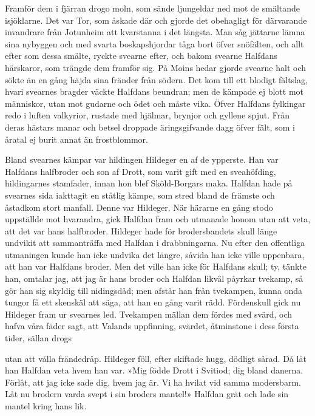 Framför dem i fjärran drogo moln, som sände ljungeldar ned mot de
smältande isjöklarne. Det var Tor, som åskade där och gjorde det
obehagligt för därvarande invandrare från Jotunheim att kvarstanna i det
längsta. Man såg jättarne lämna sina nybyggen och med svarta
boskapshjordar tåga bort öfver snöfälten, och allt efter som dessa
smälte, ryckte svearne efter, och bakom svearne Halfdans härskaror, som
trängde dem framför sig. På Moins hedar gjorde svearne halt och sökte än
en gång häjda sina fränder från södern. Det kom till ett blodigt
fältslag, hvari svearnes bragder väckte Halfdans beundran; men de
kämpade ej blott mot människor, utan mot gudarne och ödet och måste
vika. Öfver Halfdans fylkingar redo i luften valkyrior, rustade med
hjälmar, brynjor och gyllene spjut. Från deras hästars manar och betsel
droppade äringsgifvande dagg öfver fält, som i åratal ej burit annat än
frostblommor.

Bland svearnes kämpar var hildingen Hildeger en af de ypperste. Han var
Halfdans halfbroder och son af Drott, som varit gift med en sveahöfding,
hildingarnes stamfader, innan hon blef Sköld-Borgars maka. Halfdan hade
på svearnes sida iakttagit en ståtlig kämpe, som stred bland de främste
och åstadkom stort manfall. Denne var Hildeger. När härarne en gång
stodo uppställde mot hvarandra, gick Halfdan fram och utmanade honom
utan att veta, att det var hans halfbroder. Hildeger hade för
brodersbandets skull länge undvikit att sammanträffa med Halfdan i
drabbningarna. Nu efter den offentliga utmaningen kunde han icke undvika
det längre, såvida han icke ville uppenbara, att han var Halfdans
broder. Men det ville han icke för Halfdans skull; ty, tänkte han,
omtalar jag, att jag är hans broder och Halfdan likväl påyrkar tvekamp,
så gör han sig skyldig till nidingsdåd; men afstår han från tvekampen,
kunna onda tungor få ett skenskäl att säga, att han en gång varit rädd.
Fördenskull gick nu Hildeger fram ur svearnes led. Tvekampen mällan dem
fördes med svärd, och hafva våra fäder sagt, att Valands uppfinning,
svärdet, åtminstone i dess första tider, sällan drogs

utan att vålla frändedråp. Hildeger föll, efter skiftade hugg, dödligt
sårad. Då lät han Halfdan veta hvem han var. »Mig födde Drott i Svitiod;
dig bland danerna. Förlåt, att jag icke sade dig, hvem jag är. Vi ha
hvilat vid samma modersbarm. Låt nu brodern varda svept i sin broders
mantel!» Halfdan grät och lade sin mantel kring hans lik.

